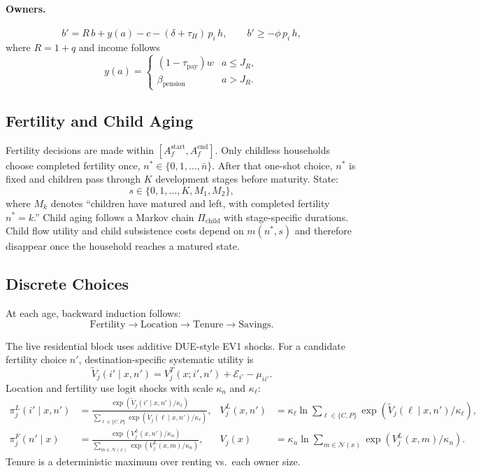\documentclass[11pt]{article}
\begin{document}
\paragraph{Owners.}
\begin{equation}
b' = R\,b + y(a) - c - (\delta+\tau_H)\,p_i\,h, \qquad b' \geq -\phi\,p_i\,h,
\end{equation}
where $R = 1+q$ and income follows
\begin{equation}
y(a) = \begin{cases}(1-\tau_{\mathrm{pay}})w & a \leq J_R,\\ \beta_{\text{pension}} & a > J_R.\end{cases}
\end{equation}

\subsection{Fertility and Child Aging}

Fertility decisions are made within $[A_f^{\text{start}}, A_f^{\text{end}}]$. Only childless households choose completed fertility once, $n^* \in \{0,1,\ldots,\bar n\}$. After that one-shot choice, $n^*$ is fixed and children pass through $K$ development stages before maturity. State:
\[
s \in \{0,1,\ldots,K,M_1,M_2\},
\]
where $M_k$ denotes ``children have matured and left, with completed fertility $n^*=k$.'' Child aging follows a Markov chain $\Pi_{\text{child}}$ with stage-specific durations. Child flow utility and child subsistence costs depend on $m(n^*,s)$ and therefore disappear once the household reaches a matured state.

\subsection{Discrete Choices}

At each age, backward induction follows:
\[
\text{Fertility} \longrightarrow \text{Location} \longrightarrow \text{Tenure} \longrightarrow \text{Savings}.
\]

The live residential block uses additive DUE-style EV1 shocks. For a candidate fertility choice $n'$, destination-specific systematic utility is
\begin{equation}
\widetilde V_j(i' \mid x,n')
=
V_j^{T}(x;i',n') + \mathcal E_{i'} - \mu_{ii'}.
\end{equation}
Location and fertility use logit shocks with scale $\kappa_n$ and $\kappa_\ell$:
\begin{align}
\pi_j^{L}(i' \mid x,n') &= \frac{\exp(\widetilde V_j(i' \mid x,n')/\kappa_\ell)}{\sum_{\ell \in \{C,P\}} \exp(\widetilde V_j(\ell \mid x,n')/\kappa_\ell)}, &
V_j^{L}(x,n') &= \kappa_\ell \ln \sum_{\ell \in \{C,P\}} \exp(\widetilde V_j(\ell \mid x,n')/\kappa_\ell),\\
\pi_j^{F}(n' \mid x) &= \frac{\exp(V_j^{L}(x,n')/\kappa_n)}{\sum_{m \in \mathcal N(x)} \exp(V_j^{L}(x,m)/\kappa_n)}, &
V_j(x) &= \kappa_n \ln \sum_{m \in \mathcal N(x)} \exp(V_j^{L}(x,m)/\kappa_n).
\end{align}
Tenure is a deterministic maximum over renting vs.\ each owner size.
\end{document}
